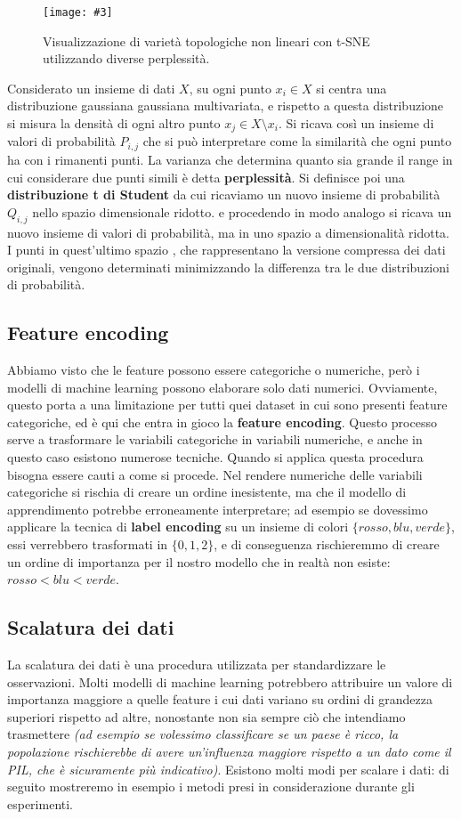 \documentclass[12pt, twoside, letterpaper]{report}
\newcommand{\img}[4] {
	\begin{figure}
		\centering
		\texttt{[image: \#3]}\\
		\caption{#1}
		\label{fig:#4}
	\end{figure}
}
\begin{document}
					\img{Visualizzazione di varietà topologiche non lineari con t-SNE utilizzando diverse perplessità. \cite{sklearn}}{0.35}{tsne.png}{tsne}
				
					Considerato un insieme di dati $X$, su ogni punto $x_i \in X$ si centra una distribuzione gaussiana gaussiana multivariata, e rispetto a questa distribuzione si misura la densità di ogni altro punto $x_j \in X \setminus x_i$. Si ricava così un insieme di valori di probabilità $P_{i,j}$ che si può interpretare come la similarità che ogni punto ha con i rimanenti punti. La varianza che determina quanto sia grande il range in cui considerare due punti simili è detta \textbf{perplessità}. Si definisce poi una \textbf{distribuzione t di Student} da cui ricaviamo un nuovo insieme di probabilità $Q_{i,j}$ nello spazio dimensionale ridotto. e procedendo in modo analogo si ricava un nuovo insieme di valori di probabilità, ma in uno spazio a dimensionalità ridotta. I punti in quest'ultimo spazio , che rappresentano la versione compressa dei dati originali, vengono determinati minimizzando la differenza tra le due distribuzioni di probabilità.
					
			\subsection{Feature encoding} 
				Abbiamo visto che le feature possono essere categoriche o numeriche, però i modelli di machine learning possono elaborare solo dati numerici. Ovviamente, questo porta a una limitazione per tutti quei dataset in cui sono presenti feature categoriche, ed è qui che entra in gioco la \textbf{feature encoding}. Questo processo serve a trasformare le variabili categoriche in variabili numeriche, e anche in questo caso esistono numerose tecniche. Quando si applica questa procedura bisogna essere cauti a come si procede. Nel rendere numeriche delle variabili categoriche si rischia di creare un ordine inesistente, ma che il modello di apprendimento potrebbe erroneamente interpretare; ad esempio se dovessimo applicare la tecnica di \textbf{label encoding} su un insieme di colori $\{rosso, blu, verde\}$, essi verrebbero trasformati in $\{0,1,2\}$, e di conseguenza rischieremmo di creare un ordine di importanza per il nostro modello che in realtà non esiste: $rosso < blu < verde$.
				
			\subsection{Scalatura dei dati} La scalatura dei dati è una procedura utilizzata per standardizzare le osservazioni. Molti modelli di machine learning potrebbero attribuire un valore di importanza maggiore a quelle feature i cui dati variano su ordini di grandezza superiori rispetto ad altre, nonostante non sia sempre ciò che intendiamo trasmettere \textit{(ad esempio se volessimo classificare se un paese è ricco, la popolazione rischierebbe di avere un'influenza maggiore rispetto a un dato come il PIL, che è sicuramente più indicativo)}. Esistono molti modi per scalare i dati: di seguito mostreremo in esempio i metodi presi in considerazione durante gli esperimenti.
			
\end{document}
